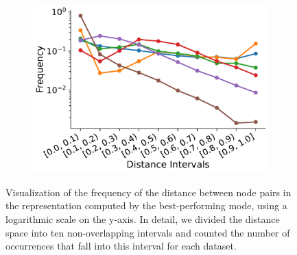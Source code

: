 \begin{figure}[thb]
	\centering
	\begin{subfigure}[t]{0.45\textwidth}
		\centering
		\includegraphics[width=\textwidth]{Figures/global_error_distances.pdf}
	\end{subfigure}
	\begin{subfigure}[t]{0.2\textwidth}
		\centering
	\end{subfigure}
	\caption{Visualization of the frequency of the distance between node pairs in the representation computed by the best-performing \gnn mode, using a logarithmic scale on the y-axis. In detail, we divided the distance space into ten non-overlapping intervals and counted the number of occurrences that fall into this interval for each dataset.}
	\label{fig:approx_error_dist}
\end{figure}

